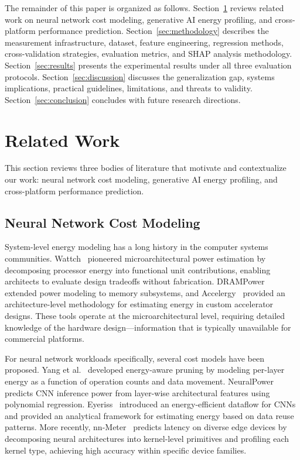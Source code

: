 \documentclass[preprint,review,12pt]{elsarticle}
\begin{document}
The remainder of this paper is organized as follows.
Section~\ref{sec:related_work} reviews related work on neural network cost modeling, generative AI energy profiling, and cross-platform performance prediction.
Section~\ref{sec:methodology} describes the measurement infrastructure, dataset, feature engineering, regression methods, cross-validation strategies, evaluation metrics, and SHAP analysis methodology.
Section~\ref{sec:results} presents the experimental results under all three evaluation protocols.
Section~\ref{sec:discussion} discusses the generalization gap, systems implications, practical guidelines, limitations, and threats to validity.
Section~\ref{sec:conclusion} concludes with future research directions.


\section{Related Work}
\label{sec:related_work}

This section reviews three bodies of literature that motivate and contextualize our work: neural network cost modeling, generative AI energy profiling, and cross-platform performance prediction.

\subsection{Neural Network Cost Modeling}
\label{sec:rw_cost_modeling}

System-level energy modeling has a long history in the computer systems communities.
Wattch~\cite{brooks2000wattch} pioneered microarchitectural power estimation by decomposing processor energy into functional unit contributions, enabling architects to evaluate design tradeoffs without fabrication.
DRAMPower~\cite{chandrasekar2012drampower} extended power modeling to memory subsystems, and Accelergy~\cite{wu2019machine} provided an architecture-level methodology for estimating energy in custom accelerator designs.
These tools operate at the microarchitectural level, requiring detailed knowledge of the hardware design---information that is typically unavailable for commercial platforms.

For neural network workloads specifically, several cost models have been proposed.
Yang et al.~\cite{yang2017designing} developed energy-aware pruning by modeling per-layer energy as a function of operation counts and data movement.
NeuralPower~\cite{cai2017neuralpower} predicts CNN inference power from layer-wise architectural features using polynomial regression.
Eyeriss~\cite{chen2016eyeriss} introduced an energy-efficient dataflow for CNNs and provided an analytical framework for estimating energy based on data reuse patterns.
More recently, nn-Meter~\cite{zhang2021nnmeter} predicts latency on diverse edge devices by decomposing neural architectures into kernel-level primitives and profiling each kernel type, achieving high accuracy within specific device families.
\end{document}
